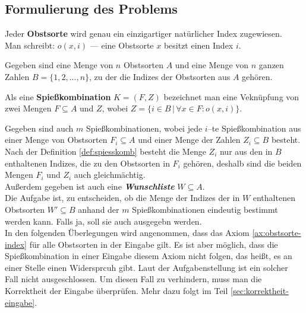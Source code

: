 \subsection{Formulierung des Problems}
\begin{axiom}\label{ax:obstsorte-index}
Jeder \textbf{Obstsorte} wird genau ein einzigartiger natürlicher Index zugewiesen.\\
Man schreibt: $o(x, i)$ --- eine Obstsorte $x$ besitzt einen Index $i$.
\end{axiom}

Gegeben sind eine Menge von $n$ Obstsorten $A$ und eine Menge von $n$ ganzen Zahlen
$B = \{1, 2, ..., n\}$, zu der die Indizes der Obstsorten aus $A$ gehören.

\begin{definition}[Spießkombination]\label{def:spiesskomb}
Als eine \textbf{Spießkombination} $K = (F, Z)$ bezeichnet man eine Veknüpfung von zwei Mengen 
$F \subseteq A$ und $Z$, wobei $Z = \{i \in B \,|\, \forall x \in F : o(x, i)\}.$
\end{definition}

Gegeben sind auch $m$ Spießkombinationen, wobei jede $i$--te Spießkombination
aus einer Menge von Obstsorten $F_i \subseteq A$ und einer Menge der Zahlen $Z_i \subseteq B$ besteht. 
Nach der Definition \ref{def:spiesskomb} besteht die Menge $Z_i$ nur aus
den in $B$ enthaltenen Indizes, die zu den Obstsorten in $F_i$ gehören, deshalb sind die beiden Mengen
$F_i$ und $Z_i$ auch gleichmächtig.\\
Außerdem gegeben ist auch eine \textit{\textbf{Wunschliste}} $W \subseteq A$.\\

Die Aufgabe ist, zu entscheiden,
ob die Menge der Indizes der in $W$ enthaltenen Obstsorten $W' \subseteq B$ anhand der $m$ 
Spießkombinationen eindeutig bestimmt werden kann. Falls ja, soll sie auch ausgegebn werden.\\

In den folgenden Überlegungen wird angenommen, dass das Axiom \ref{ax:obstsorte-index} für alle
Obstsorten in der Eingabe gilt.
Es ist aber möglich, dass die Spießkombination in einer Eingabe diesem Axiom nicht folgen, das heißt,
es an einer Stelle einen Widersprcuh gibt.
Laut der Aufgabenstellung ist ein solcher Fall nicht ausgeschlossen. 
Um diesen Fall zu verhindern, muss man die Korrektheit der Eingabe überprüfen. 
Mehr dazu folgt im Teil \ref{sec:korrektheit-eingabe}.
